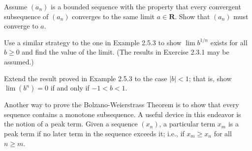 \begin{solution}
  \TODO
\end{solution}

\begin{exercise}
  Assume $\left(a_{n}\right)$ is a bounded sequence with the property that every convergent subsequence of $\left(a_{n}\right)$ converges to the same limit $a \in \mathbf{R}$. Show that $\left(a_{n}\right)$ must converge to $a$.
\end{exercise}

\begin{solution}
  \TODO
\end{solution}

\begin{exercise}
  Use a similar strategy to the one in Example 2.5.3 to show $\lim b^{1 / n}$ exists for all $b \geq 0$ and find the value of the limit. (The results in Exercise 2.3.1 may be assumed.)
\end{exercise}

\begin{solution}
  \TODO
\end{solution}

\begin{exercise}
  Extend the result proved in Example 2.5.3 to the case $|b|<1$; that is, show $\lim \left(b^{n}\right)=0$ if and only if $-1<b<1$.
\end{exercise}

\begin{solution}
  \TODO
\end{solution}

\begin{exercise}
  Another way to prove the Bolzano-Weierstrass Theorem is to show that every sequence contains a monotone subsequence. A useful device in this endeavor is the notion of a peak term. Given a sequence $\left(x_{n}\right)$, a particular term $x_{m}$ is a peak term if no later term in the sequence exceeds it; i.e., if $x_{m} \geq x_{n}$ for all $n \geq m$.
\end{exercise}

\begin{solution}
  \enum{
  \item \TODO
  \item \TODO
  }
\end{solution}


